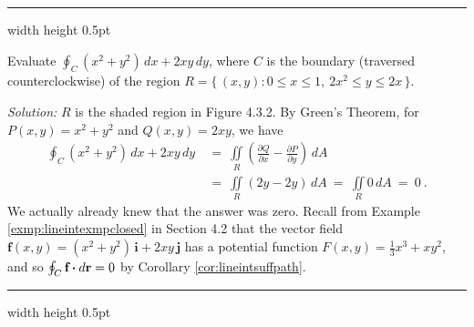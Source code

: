 \vspace{3mm}
\hrule width \textwidth height 0.5pt
\begin{exmp}\label{exmp:greenexmp}
  Evaluate $\oint_{C} (x^2 + y^2 )\,dx + 2xy\,dy$, where $C$ is the boundary (traversed counterclockwise) of the region
  $R = \lbrace\,(x,y): 0 \le x \le 1,~2x^2 \le y \le 2x \,\rbrace$.\vspace{-1mm}

 \piccaption[]{}
 \par\noindent \emph{Solution:} $R$ is the shaded region in Figure 4.3.2. By Green's Theorem, for
 $P(x,y)=x^2 + y^2$ and $Q(x,y)=2xy$, we have
 \begin{align*}
  \oint_C (x^2 + y^2 )\,dx + 2xy\,dy ~&=~ \iint\limits_{R} \left( \frac{\partial Q}{\partial x} -
   \frac{\partial P}{\partial y} \right)\,dA\\
   &=~ \iint\limits_{R} (2y - 2y)\,dA
   ~=~ \iint\limits_{R} 0\,dA ~=~ 0 ~.
 \end{align*}\vspace{-14mm}
 We actually already knew that the answer was zero. Recall from Example
 \ref{exmp:lineintexmpclosed} in Section 4.2 that the vector field
 $\textbf{f}(x,y) = ( x^2 + y^2 )\,\textbf{i} + 2xy\,\textbf{j}$ has a potential function
 $F(x,y)=\frac{1}{3}x^3 + xy^2$, and so $\oint_{C} \textbf{f} \bm{\cdot} d\textbf{r} = 0$ by Corollary \ref{cor:lineintsuffpath}.
 \end{exmp}
\hrule width \textwidth height 0.5pt
